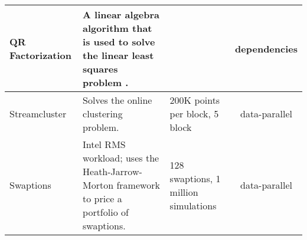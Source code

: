 \begin{table*}[h]
\begin{tabular}{|p{2cm}|p{5.7cm}|p{4.5cm}|c|}
	QR Factorization & A linear algebra algorithm that is used to solve the linear least squares problem \cite{QR}.& \kc{multiple} & dependencies \\ \hline
	Streamcluster & Solves the online clustering problem. & 200K points per block, 5 block & 
data-parallel\\ \hline
	Swaptions & Intel RMS workload; uses the Heath-Jarrow-Morton framework to price a portfolio of swaptions. & 128 swaptions, 1 million  simulations & data-parallel\\ \hline
	\end{tabular}
	\label{tab:parsec}
\end{table*}
\fi